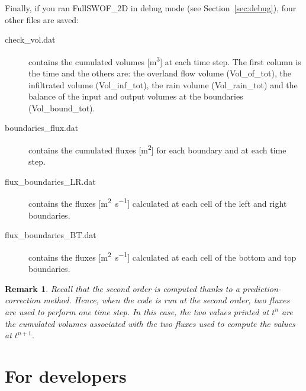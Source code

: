\documentclass[a4paper, 11pt]{article}
\newcommand{\FullSWOF}{FullSWOF\_2D}
\newtheorem{rmk}{Remark}
\begin{document}
\medskip

Finally, if you ran \FullSWOF{} in debug mode (see Section~\ref{sec:debug}), four other files are saved:
\begin{description}
	\item[\textsf{check\_vol.dat}] contains the cumulated volumes [\si{\cubic\meter}] at each time step.
	      The first column is the time and the others are: the overland flow volume (Vol\_of\_tot), the infiltrated volume (Vol\_inf\_tot), the rain volume (Vol\_rain\_tot) and the balance of the input and output volumes at the boundaries (Vol\_bound\_tot).
	\item[\textsf{boundaries\_flux.dat}] contains the cumulated fluxes [\si{\square\meter}] for each boundary and at each time step.
	\item[\textsf{flux\_boundaries\_LR.dat}] contains the fluxes [\si{\square\meter\per\second}] calculated at each cell of the left and right boundaries.
	\item[\textsf{flux\_boundaries\_BT.dat}] contains the fluxes [\si{\square\meter\per\second}] calculated at each cell of the bottom and top boundaries.
\end{description}

\begin{rmk}
	Recall that the second order is computed thanks to a prediction-correction method.
	Hence, when the code is run at the second order, two fluxes are used to perform one time step.
	In this case, the two values printed at \(t^n\) are the cumulated volumes associated with the two fluxes used to compute the values at \(t^{n+1}\).
\end{rmk}

\section{For developers}\label{sec:dvp}
\end{document}
